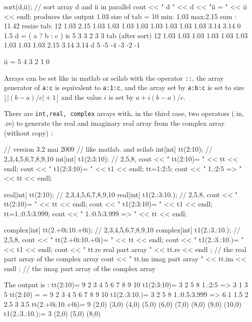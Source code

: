 \documentclass[a4paper,twoside,12pt]{book}
\def\n{\nabla}
\begin{document}
sort(d,ii); // sort array d and ii in parallel
cout << " d " << d << "\n ii = " << ii << endl;
\eFF
{} %
produces the output
 1.03 size of tab = 10 min: 1.03  max:2.15 sum : 11.42
 resize tab: 12
        1.03    2.15    1.03    1.03    1.03
        1.03    1.03    1.03    1.03    1.03
        3.14    3.14
 0  1.5
 d = ( a ? b : c )  is  5
          3       3       2       3       3
 tab (after sort) 12	
	1.03	1.03	1.03	1.03	1.03
	1.03	1.03	1.03	1.03	2.15
	3.14	3.14	
 d 5	
	 -5	 -4	 -3	 -2	 -1
	
 ii = 5	
	  4	  3	  2	  1	  0

\eFF

Arrays can be set like in matlab or scilab with the operator \verb!::!, the
array generator of  \verb!a:c! is equivalent to \verb!a:1:c!, and the  array set by \verb!a:b:c!
is set to size  $ \lfloor |(b-a)/c|+1 \rfloor$  and the value $i$ is set by
$ a + i (b-a)/c$.

There are  \texttt{int,real, complex} arrays
with, in the third case, two operators (.in, .re) to generate the real and imaginary  real array  from the complex array
(without copy)
:

\bFF
//  version 3.2  mai 2009
//  like matlab. and scilab
{
int[int] tt(2:10); //  2,3,4,5,6,7,8,9,10
int[int] t1(2:3:10); // 2,5,8,
cout << " tt(2:10)= " << tt << endl;
cout << " t1(2:3:10)= " << t1 << endl;
tt=1:2:5;
cout << " 1.:2:5 =>  " << tt << endl;
}

{
real[int] tt(2:10); //  2,3,4,5,6,7,8,9,10
real[int] t1(2.:3:10.); // 2,5,8,
cout << " tt(2:10)= " << tt << endl;
cout << " t1(2:3:10)= " << t1 << endl;
tt=1.:0.5:3.999;
cout << " 1.:0.5:3.999 =>  " << tt << endl;
}
{
complex[int] tt(2.+0i:10.+0i); //  2,3,4,5,6,7,8,9,10
complex[int] t1(2.:3.:10.); // 2,5,8,
cout << " tt(2.+0i:10.+0i)= " << tt << endl;
cout << " t1(2.:3.:10.)= " << t1 << endl;
cout << " tt.re real part array   " << tt.re << endl ;
 //  the real part array of the complex array 
cout << " tt.im imag part array   " << tt.im << endl ;
//  the imag part array of the complex array 

}
\eFF
The output is :
\bFF
 tt(2:10)= 9	
	  2	  3	  4	  5	  6
	  7	  8	  9	 10	
 t1(2:3:10)= 3	
	  2	  5	  8	
 1.:2:5 =>  3	
	  1	  3	  5	
 tt(2:10) = = 9	
	  2	  3	  4	  5	  6
	  7	  8	  9	 10	
 t1(2.:3:10.)= 3	
	  2	  5	  8	
 1.:0.5:3.999 =>  6	
	  1	1.5	  2	2.5	  3
	3.5	
 tt(2.+0i:10.+0i)= 9	
	(2,0)	(3,0)	(4,0)	(5,0)	(6,0)
	(7,0)	(8,0)	(9,0)	(10,0)	
 t1(2.:3.:10.);= 3	
	(2,0)	(5,0)	(8,0)	
\end{document}
